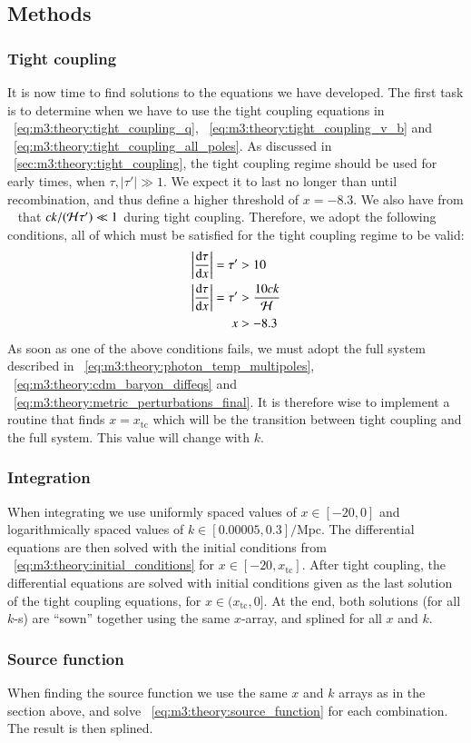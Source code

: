 \subsection{Methods}\label{sec:m3:methods}

\subsubsection{Tight coupling}
    It is now time to find solutions to the equations we have developed. The first task is to determine when we have to use the tight coupling equations in ~\cref{eq:m3:theory:tight_coupling_q}, ~\cref{eq:m3:theory:tight_coupling_v_b} and ~\cref{eq:m3:theory:tight_coupling_all_poles}. As discussed in ~\cref{sec:m3:theory:tight_coupling}, the tight coupling regime should be used for early times, when $\tau, |\tau'| \gg1$. We expect it to last no longer than until recombination, and thus define a higher threshold of $x=-8.3$. We also have from ~\cite{https://doi.org/10.48550/arxiv.astro-ph/0606683} that $ck/(\mathcal{H}\tau')\ll1$ during tight coupling. Therefore, we adopt the following conditions, all of which must be satisfied for the tight coupling regime to be valid:
    \begin{equation}
        \begin{split}
            \abs{\dv{\tau}{x}} = \tau' &> 10 \\
            \abs{\dv{\tau}{x}} = \tau' &> \frac{10ck}{\mathcal{H}} \\
            x &> -8.3
        \end{split}
    \end{equation}
    As soon as one of the above conditions fails, we must adopt the full system described in ~\cref{eq:m3:theory:photon_temp_multipoles}, ~\cref{eq:m3:theory:cdm_baryon_diffeqs} and ~\cref{eq:m3:theory:metric_perturbations_final}. It is therefore wise to implement a routine that finds $x=x_\mathrm{tc}$ which will be the transition between tight coupling and the full system. This value will change with $k$. 

\subsubsection{Integration}
    When integrating we use uniformly spaced values of $x\in[-20,0]$ and logarithmically spaced values of $k\in[0.00005, 0.3]/\mathrm{Mpc}$. The differential equations are then solved with the initial conditions from ~\cref{eq:m3:theory:initial_conditions} for $x\in[-20,x_\mathrm{tc}]$. After tight coupling, the differential equations are solved with initial conditions given as the last solution of the tight coupling equations, for $x\in(x_\mathrm{tc},0]$. At the end, both solutions (for all $k$-s) are ``sown'' together using the same $x$-array, and splined for all $x$ and $k$. 

\subsubsection{Source function}
    When finding the source function we use the same $x$ and $k$ arrays as in the section above, and solve ~\cref{eq:m3:theory:source_function} for each combination. The result is then splined. 